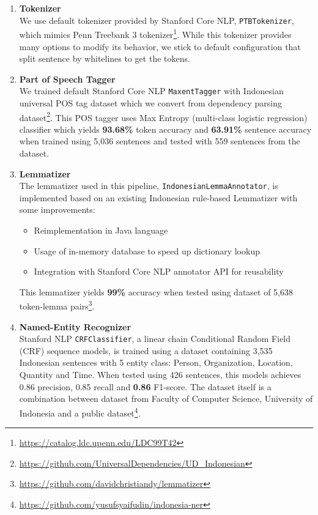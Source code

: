 \documentclass[conference,compsoc]{IEEEtran}
\begin{document}
\begin{enumerate}

\item \textbf{Tokenizer} \\
We use default tokenizer provided by Stanford Core NLP, \verb|PTBTokenizer|\cite{manningptbtokenizer}, which mimics Penn Treebank 3 tokenizer\footnote{\url{https://catalog.ldc.upenn.edu/LDC99T42}}. While this tokenizer provides many options to modify its behavior, we stick to default configuration that split sentence by whitelines to get the tokens.\\

\item \textbf{Part of Speech Tagger} \\
We trained default Stanford Core NLP \verb|MaxentTagger|\cite{toutanova2003feature} with Indonesian universal POS tag dataset which we convert from dependency parsing dataset\footnote{\url{https://github.com/UniversalDependencies/UD_Indonesian}}. This POS tagger uses Max Entropy (multi-class logistic regression) classifier which yields \textbf{93.68\%} token accuracy and \textbf{63.91\%} sentence accuracy when trained using 5,036 sentences and tested with 559 sentences from the dataset. \\

\item \textbf{Lemmatizer} \\
The lemmatizer used in this pipeline, \verb|IndonesianLemmaAnnotator|, is implemented based on an existing Indonesian rule-based Lemmatizer\cite{suhartono2014lemmatization} with some improvements:

\begin{itemize}
\item Reimplementation in Java language
\item Usage of in-memory database to speed up dictionary lookup
\item Integration with Stanford Core NLP annotator API for reusability
\end{itemize}

This lemmatizer yields \textbf{99\%} accuracy when tested using dataset of 5,638 token-lemma pairs\footnote{\url{https://github.com/davidchristiandy/lemmatizer}}. \\

\item \textbf{Named-Entity Recognizer} \\

Stanford NLP \verb|CRFClassifier|\cite{finkel2005incorporating}, a linear chain Conditional Random Field (CRF) sequence models, is trained using a dataset containing 3,535 Indonesian sentences with 5 entity class: Person, Organization, Location, Quantity and Time. When tested using 426 sentences, this models achieves 0.86 precision, 0.85 recall and \textbf{0.86} F1-score. The dataset itself is a combination between dataset from Faculty of Computer Science, University of Indonesia and a public dataset\footnote{\url{https://github.com/yusufsyaifudin/indonesia-ner}}. \\


\end{enumerate}
\end{document}

